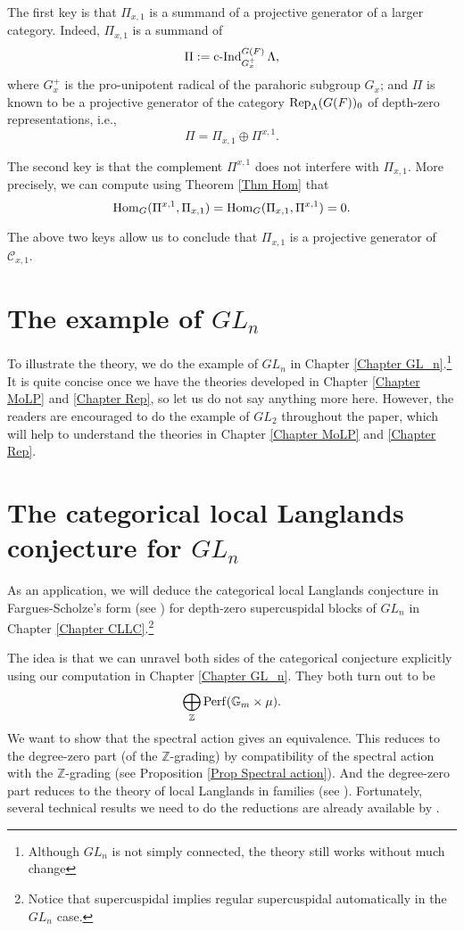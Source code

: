 The first key is that $\Pi_{x,1}$ is a summand of a projective generator of a larger category. Indeed, $\Pi_{x,1}$ is a summand of
$$\Pi:=\operatorname{\operatorname{c-Ind}}_{G_x^+}^{G(F)}\Lambda,$$
where $G_x^+$ is the pro-unipotent radical of the parahoric subgroup $G_x$; and $\Pi$ is known to be a projective generator of the category $\operatorname{\operatorname{Rep}}_{\Lambda}(G(F))_0$ of depth-zero representations, i.e., 
$$\Pi=\Pi_{x,1} \oplus \Pi^{x,1}.$$

The second key is that the complement $\Pi^{x,1}$ does not interfere with $\Pi_{x,1}$. More precisely, we can compute using Theorem \ref{Thm Hom} that 
$$\operatorname{\operatorname{Hom}}_{G}(\Pi^{x,1}, \Pi_{x,1})=\operatorname{\operatorname{Hom}}_{G}(\Pi_{x,1}, \Pi^{x,1})=0.$$

The above two keys allow us to conclude that $\Pi_{x,1}$ is a projective generator of $\mathcal{C}_{x,1}$. 




\section{The example of $GL_n$}

To illustrate the theory, we do the example of $GL_n$ in Chapter \ref{Chapter GL_n}.\footnote{Although $GL_n$ is not simply connected, the theory still works without much change} It is quite concise once we have the theories developed in Chapter \ref{Chapter MoLP} and \ref{Chapter Rep}, so let us do not say anything more here. However, the readers are encouraged to do the example of $GL_2$ throughout the paper, which will help to understand the theories in Chapter \ref{Chapter MoLP} and \ref{Chapter Rep}. 

\section{The categorical local Langlands conjecture for $GL_n$}

As an application, we will deduce the categorical local Langlands conjecture in Fargues-Scholze's form (see \cite[Conjecture X.3.5]{fargues2021geometrization}) for depth-zero supercuspidal blocks of $GL_n$ in Chapter \ref{Chapter CLLC}.\footnote{Notice that supercuspidal implies regular supercuspidal automatically in the $GL_n$ case.}

The idea is that we can unravel both sides of the categorical conjecture explicitly using our computation in Chapter \ref{Chapter GL_n}. They both turn out to be
$$\bigoplus_{\mathbb{Z}}\operatorname{\operatorname{Perf}}(\mathbb{G}_m \times \mu).$$ 
We want to show that the spectral action gives an equivalence. This reduces to the degree-zero part (of the $\mathbb{Z}$-grading) by compatibility of the spectral action with the $\mathbb{Z}$-grading (see Proposition \ref{Prop Spectral action}). And the degree-zero part reduces to the theory of local Langlands in families (see \cite{helm2018converse}). Fortunately, several technical results we need to do the reductions are already available by \cite{zou2022categorical}.

